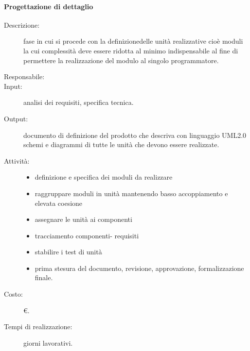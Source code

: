 \paragraph{Progettazione di dettaglio}
\begin{description}
\item[Descrizione:] fase in cui si procede con la definizionedelle unità realizzative cioè moduli la cui complessità deve essere ridotta al minimo indispensabile al fine di permettere la realizzazione del modulo al singolo programmatore.
\item[Responsabile:] 
\item[Input:] analisi dei requisiti, specifica tecnica.
\item[Output:] documento di definizione del prodotto che descriva con linguaggio UML2.0 schemi e diagrammi di tutte le unità che devono essere realizzate.
\item[Attività:]
\begin{itemize}
\item definizione e specifica dei moduli da realizzare
\item raggruppare moduli in unità mantenendo basso accoppiamento e elevata coesione
\item assegnare le unità ai componenti
\item tracciamento componenti- requisiti
\item stabilire i test di unità
\item prima stesura del documento, revisione, approvazione, formalizzazione finale.
\end{itemize}
\item[Costo:] \euro{}.
\item[Tempi di realizzazione:]  giorni lavorativi.
\end{description}

